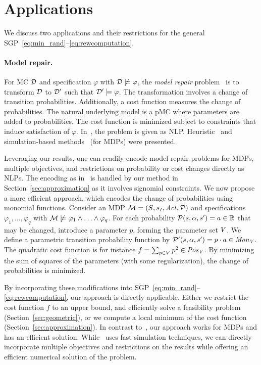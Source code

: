 \section{Applications}\label{sec:applications}
We discuss two applications and their restrictions for the general SGP~\eqref{eq:min_rand}--\eqref{eq:rewcomputation}.\vspace{-.2cm}
%
\paragraph{Model repair.}
For MC $\dtmc$ and specification $\varphi$ with $\dtmc\not\models\varphi$, the \emph{model repair} problem~\cite{bartocci2011model} is to transform $\dtmc$ to $\dtmc'$ such that $\dtmc'\models\varphi$. The transformation involves a change of transition probabilities. Additionally, a cost function measures the change of probabilities. The natural underlying model is a pMC where parameters are added to probabilities. The cost function is minimized subject to constraints that induce satisfaction of $\varphi$. In~\cite{bartocci2011model}, the problem is given as NLP. Heuristic~\cite{pathak-et-al-nfm-2015} and simulation-based methods~\cite{chen2013model} (for MDPs) were presented.

Leveraging our results, one can readily encode model repair problems for MDPs, multiple objectives, and restrictions on probability or cost changes directly as NLPs. The encoding as in~\cite{bartocci2011model} is  handled by our method in Section~\ref{sec:approximation} as it involves signomial constraints. We now propose a more efficient approach, which encodes the change of probabilities using monomial functions.
%
Consider an MDP $\MdpInit$ and specifications $\varphi_1,\ldots,\varphi_q$ with $\mdp\not\models\varphi_1\land\ldots\land\varphi_q$. For each probability $\pmdp(s,\act,s')=a\in\R$ that may be changed, introduce a parameter $p$, forming the parameter set $\Paramvar$. We define a parametric transition probability function by $\pmdp'(s,\act,s')=p\cdot a\in\monos[V]$. The quadratic cost function is for instance  $f=\sum_{p\in V} p^2\in\posys[V]$. 
By minimizing the sum of squares of the parameters (with some regularization), the change of probabilities is minimized.

By incorporating these modifications into SGP~\eqref{eq:min_rand}--\eqref{eq:rewcomputation}, our approach is directly applicable. Either we restrict the cost function $f$ to an upper bound, and efficiently solve a feasibility problem (Section~\ref{sec:geometric}), or we compute a local minimum of the cost function (Section~\ref{sec:approximation}).
%
In contrast to~\cite{bartocci2011model}, our approach works for MDPs and has an efficient solution. While~\cite{chen2013model} uses fast simulation techniques, we can directly incorporate multiple objectives and restrictions on the results while offering an efficient numerical solution of the problem.


